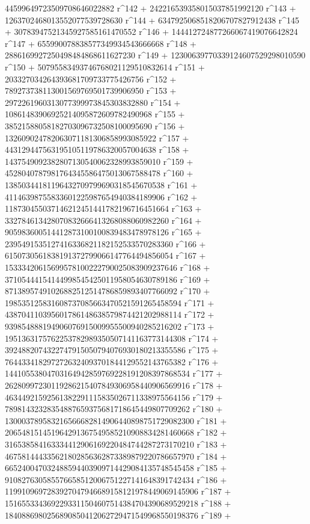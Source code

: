        44599649723509708646022882 r^142 + 
       242216539358015037851992120 r^143 + 
       1263702468013552077539728630 r^144 + 
       6347925068518206707827912438 r^145 + 
       30783947521345927585161470552 r^146 + 
       144412724877266067419076642824 r^147 + 
       655990078838577349934543666668 r^148 + 
       2886169927250498484868611627230 r^149 + 
       12300639770339124607529298010590 r^150 + 
       50795583493746768021129510832614 r^151 + 
       203327034264393681709733775426756 r^152 + 
       789273738113001569769501739906950 r^153 + 
       2972261960313077399973845303832880 r^154 + 
       10861483906925214095872609782490968 r^155 + 
       38521588058182703096732508100095690 r^156 + 
       132609024782063071181306858993085922 r^157 + 
       443129447563195105119786320057004638 r^158 + 
       1437549092382807130540062328993859010 r^159 + 
       4528040787981764345586475013067588478 r^160 + 
       13850344181196432709799690318545670538 r^161 + 
       41146398755833601225987654940384189906 r^162 + 
       118730455037146212451441782196716451664 r^163 + 
       332784613428070832666413268088060982260 r^164 + 
       905983600514412873100100839483478978126 r^165 + 
       2395491535127416336821182152533570283360 r^166 + 
       6150730561838191372799066147764494856054 r^167 + 
       15333420615699578100222790025083909237646 r^168 + 
       37105444154144998545425011958054630789186 r^169 + 
       87138957491026882512514786859893407766092 r^170 + 
       198535125831608737085663470521591265458594 r^171 + 
       438704110395601786148638579874421202988114 r^172 + 
       939854888194906076915009955500940285216202 r^173 + 
       1951363175762253782989350507141163773144308 r^174 + 
       3924882074322747915050794076930180213355586 r^175 + 
       7644334182972726324093701844129552143765382 r^176 + 
       14410553804703164942859769228191208397868534 r^177 + 
       26280997230119286215407849306958440906569916 r^178 + 
       46344921592561382291115835026711338975564156 r^179 + 
       78981432328354887659375681718645449807709262 r^180 + 
       130003789583216566682814906440898751729082300 r^181 + 
       206548151451964291367549585210908834281460668 r^182 + 
       316538584163334412906169220484744287273170210 r^183 + 
       467581444335621802856362873389879220786657970 r^184 + 
       665240047032488594403909714429084135748545458 r^185 + 
       910827630585576658512006751227141648391742434 r^186 + 
       1199109697283927047946689158121978449069145906 r^187 + 
       1516553343692293311504607514384704390689529218 r^188 + 
       1840886980256890850412062729471549968550198376 r^189 + 
